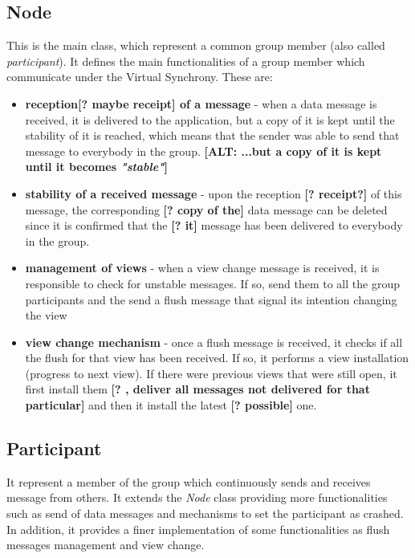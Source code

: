 \documentclass[11pt]{article}
\begin{document}
	\subsection{Node}
	This is the main class, which represent a common group member (also called \textit{participant}). It defines the main functionalities of a group member which communicate under the Virtual Synchrony. These are:
	\begin{itemize}
		\item \textbf{reception\textbf{[? maybe receipt]} of a message} - when a data message is received, it is delivered to the application, but a copy of it is kept until the stability of it is reached, which means that the sender was able to send that message to everybody in the group. \textbf{[ALT: ...but a copy of it is kept until it becomes \textit{"stable"}]}
		\item \textbf{stability of a received message} - upon the reception \textbf{[? receipt?]} of this message, the corresponding \textbf{[? copy of the]} data message can be deleted since it is confirmed that the \textbf{[? it]} message has been delivered to everybody in the group.
		\item \textbf{management of views} - when a view change message is received, it is responsible to check for unstable messages. If so, send them to all the group participants and the send a flush message that signal its intention changing the view
		\item \textbf{view change mechanism} - once a flush message is received, it checks if all the flush for that view has been received. If so, it performs a view installation (progress to next view). If there were previous views that were still open, it first install them \textbf{[? , deliver all messages not delivered for that particular]} and then it install the latest \textbf{[? possible]} one.
	\end{itemize}
	
	\subsection{Participant}
	It represent a member of the group which continuously sends and receives message from others. It extends the \textit{Node} class providing more functionalities such as send of data messages and mechanisms to set the participant as crashed. In addition, it provides a finer implementation of some functionalities as flush messages management and view change.
	
\end{document}
